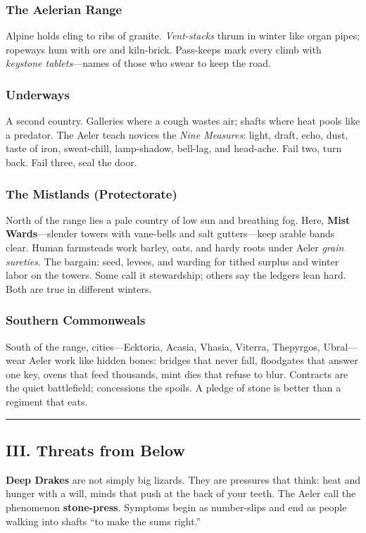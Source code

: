 \documentclass[11pt]{article}
\begin{document}
\subsubsection*{The Aelerian Range}
Alpine holds cling to ribs of granite. \emph{Vent-stacks} thrum in winter like organ pipes; ropeways hum with ore and kiln-brick. Pass-keeps mark every climb with \emph{keystone tablets}---names of those who swear to keep the road.

\subsubsection*{Underways}
A second country. Galleries where a cough wastes air; shafts where heat pools like a predator. The Aeler teach novices the \emph{Nine Measures}: light, draft, echo, dust, taste of iron, sweat-chill, lamp-shadow, bell-lag, and head-ache. Fail two, turn back. Fail three, seal the door.

\subsubsection*{The Mistlands (Protectorate)}
North of the range lies a pale country of low sun and breathing fog. Here, \textbf{Mist Wards}---slender towers with vane-bells and salt gutters---keep arable bands clear. Human farmsteads work barley, oats, and hardy roots under Aeler \emph{grain sureties}. The bargain: seed, levees, and warding for tithed surplus and winter labor on the towers. Some call it stewardship; others say the ledgers lean hard. Both are true in different winters.

\subsubsection*{Southern Commonweals}
South of the range, cities---Ecktoria, Acasia, Vhasia, Viterra, Thepyrgos, Ubral---wear Aeler work like hidden bones: bridges that never fall, floodgates that answer one key, ovens that feed thousands, mint dies that refuse to blur. Contracts are the quiet battlefield; concessions the spoils. A pledge of stone is better than a regiment that eats.

\medskip\hrule\medskip

\subsection{III. Threats from Below}

\textbf{Deep Drakes} are not simply big lizards. They are pressures that think: heat and hunger with a will, minds that push at the back of your teeth. The Aeler call the phenomenon \textbf{stone-press}. Symptoms begin as number-slips and end as people walking into shafts ``to make the sums right.''
\end{document}

